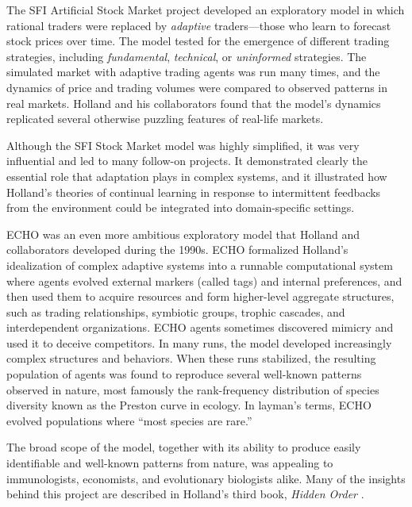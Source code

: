 \documentclass{sig-alternate}
\begin{document}
The SFI Artificial Stock Market project \cite{Arthur1997b,Palmer1994}
developed an exploratory model in which rational
traders were replaced by \emph{adaptive} traders---those who learn to
forecast stock prices over time.  The model tested for the
emergence of different trading strategies, including
\emph{fundamental}, \emph{technical}, or \emph{uninformed}
strategies. The simulated market with adaptive trading agents was run
many times, and the dynamics of price and trading volumes were
compared to observed patterns in real markets.  Holland and his
collaborators found that the model's dynamics replicated several
otherwise puzzling features of real-life markets.

Although the SFI Stock Market model was highly simplified, it was very
influential and led to many follow-on projects.  It 
demonstrated clearly the essential role that adaptation plays in complex
systems, and it illustrated how Holland's theories of continual learning
in response to intermittent feedbacks from the environment could be
integrated into domain-specific settings.

ECHO \cite{Holland1999,Hraber1997} was an even more ambitious exploratory model
that Holland and collaborators developed during the 1990s. 
ECHO formalized Holland's idealization of complex adaptive systems
into a runnable computational system where agents evolved external
markers (called tags) and internal preferences, and then used them to
acquire resources and form higher-level aggregate structures, such as
trading relationships, symbiotic groups, trophic cascades, and
interdependent organizations.  ECHO agents sometimes discovered
mimicry and used it to deceive competitors.  In many runs, the model
developed increasingly complex structures and behaviors. %
When these runs stabilized, the resulting population of agents was
found to reproduce several well-known patterns observed in nature,
most famously the rank-frequency distribution of species diversity
known as the Preston curve in ecology.  In layman's terms, ECHO
evolved populations where ``most species are rare.''

The broad scope of the model, together with its ability to produce
easily identifiable and well-known patterns from nature, was appealing
to immunologists, economists, and evolutionary biologists alike.  Many
of the insights behind this project are described in Holland's third
book, \emph{Hidden Order} \cite{Holland1995}.  
\end{document}
